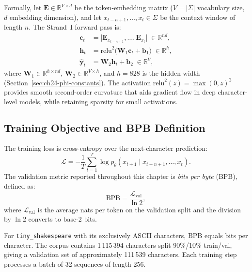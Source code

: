 Formally, let $\mathbf{E} \in \mathbb{R}^{V \times d}$ be the token-embedding
matrix ($V = |\Sigma|$ vocabulary size, $d$ embedding dimension), and let
$x_{t-n+1}, \ldots, x_t \in \Sigma$ be the context window of length $n$.
The Strand~I forward pass is:
\begin{align}
  \mathbf{c}_t &= \bigl[\mathbf{E}_{x_{t-n+1}}, \ldots, \mathbf{E}_{x_t}\bigr]
                  \;\in \mathbb{R}^{nd}, \label{eq:ch24-context} \\
  \mathbf{h}_t &= \mathrm{relu}^2\!\bigl(\mathbf{W}_1 \mathbf{c}_t + \mathbf{b}_1\bigr)
                  \;\in \mathbb{R}^{h}, \label{eq:ch24-hidden} \\
  \hat{\mathbf{y}}_t &= \mathbf{W}_2 \mathbf{h}_t + \mathbf{b}_2
                  \;\in \mathbb{R}^{V}, \label{eq:ch24-logit}
\end{align}
where $\mathbf{W}_1 \in \mathbb{R}^{h \times nd}$,
$\mathbf{W}_2 \in \mathbb{R}^{V \times h}$, and $h = 828$ is the hidden
width (Section~\ref{sec:ch24-phi-constants}).  The activation
$\mathrm{relu}^2(z) = \max(0, z)^2$ \cite{so2022primer_relu2} provides
smooth second-order curvature that aids gradient flow in deep character-level
models, while retaining sparsity for small activations.

\subsection{Training Objective and BPB Definition}
\label{subsec:ch24-training-obj}

The training loss is cross-entropy over the next-character prediction:
\begin{equation}\label{eq:ch24-ce}
  \mathcal{L} = -\frac{1}{T}\sum_{t=1}^{T}
    \log p_\theta(x_{t+1} \mid x_{t-n+1}, \ldots, x_t).
\end{equation}
The validation metric reported throughout this chapter is
\emph{bits per byte} (BPB), defined as:
\begin{equation}\label{eq:ch24-bpb}
  \mathrm{BPB} = \frac{\mathcal{L}_{\text{val}}}{\ln 2},
\end{equation}
where $\mathcal{L}_{\text{val}}$ is the average nats per token on the
validation split and the division by $\ln 2$ converts to base-2 bits.

For \texttt{tiny\_shakespeare} with its exclusively ASCII characters, BPB
equals bits per character.  The corpus contains 1\,115\,394 characters split
90\%/10\% train/val, giving a validation set of approximately 111\,539 characters.
Each training step processes a batch of 32 sequences of length 256.

